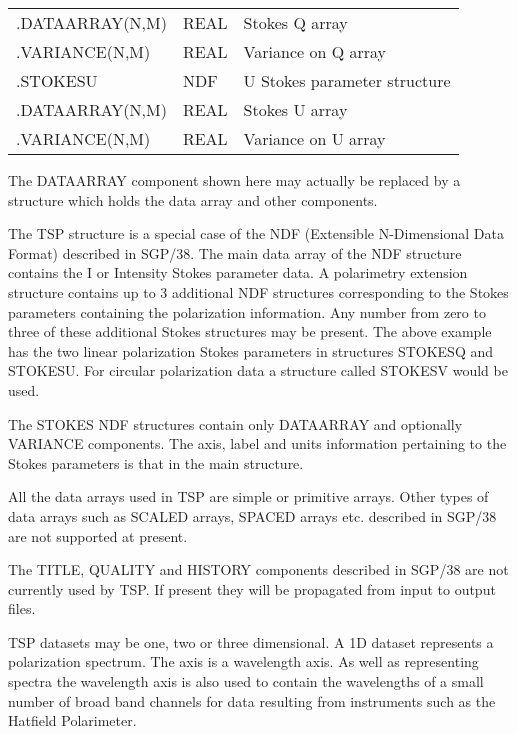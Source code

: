 \documentclass[11pt,twoside]{article}
\renewcommand{\_}{\texttt{\symbol{95}}}
\begin{document}
\begin{tabular}{lll}
\hspace*{3cm}.DATA\_ARRAY(N,M) & \_REAL & Stokes Q array \\
\hspace*{3cm}.VARIANCE(N,M) & \_REAL & Variance on Q array\\
\hspace*{2cm}.STOKES\_U & NDF & U Stokes parameter structure\\
\hspace*{3cm}.DATA\_ARRAY(N,M) & \_REAL & Stokes U array \\
\hspace*{3cm}.VARIANCE(N,M) & \_REAL & Variance on U array \\
\end{tabular}

The DATA\_ARRAY component shown here may actually be replaced by a structure
which holds the data array and other components.

The TSP structure is a special case of the NDF (Extensible N-Dimensional
Data Format) described in SGP/38. The main data array of the NDF structure
contains the I or Intensity Stokes parameter data. A polarimetry extension
structure contains up to 3 additional NDF structures corresponding to the
Stokes parameters containing the polarization information. Any number from
zero to three of these additional Stokes structures may be present. The
above example has the two linear polarization Stokes parameters in structures
STOKES\_Q and STOKES\_U. For circular polarization data
a structure called STOKES\_V would be used.

The STOKES NDF structures contain only DATA\_ARRAY and optionally VARIANCE
components. The axis, label and units information pertaining to the Stokes
parameters is that in the main structure.

All the data arrays used in TSP are simple or primitive arrays. Other types
of data arrays such as SCALED arrays, SPACED arrays etc. described in SGP/38
are not supported at present.

The TITLE, QUALITY and HISTORY components described in SGP/38 are not
currently used by TSP. If present they will be propagated from input to
output files.

TSP datasets may be one, two or three dimensional. A 1D dataset represents
a polarization spectrum. The axis is a wavelength axis. As well as representing
spectra the wavelength axis is also used to contain the wavelengths of a
small number of broad band channels for data resulting from instruments
such as the Hatfield Polarimeter.
\end{document}
